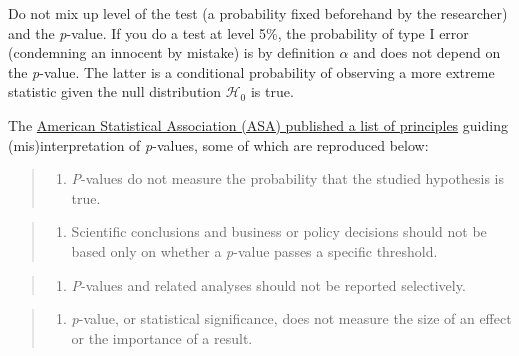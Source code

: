 \documentclass[
  11pt,
  letterpaper,
]{scrbook}
\providecommand{\tightlist}{%
  \setlength{\itemsep}{0pt}\setlength{\parskip}{0pt}}\usepackage{longtable,booktabs,array}
\theoremstyle{definition}
\theoremstyle{definition}
\theoremstyle{remark}
\begin{document}
Do not mix up level of the test (a probability fixed beforehand by the
researcher) and the \emph{p}-value. If you do a test at level 5\%, the
probability of type I error (condemning an innocent by mistake) is by
definition \(\alpha\) and does not depend on the \emph{p}-value. The
latter is a conditional probability of observing a more extreme
statistic given the null distribution \(\mathscr{H}_0\) is true.

\begin{tcolorbox}[enhanced jigsaw, opacityback=0, opacitybacktitle=0.6, leftrule=.75mm, colbacktitle=quarto-callout-caution-color!10!white, breakable, toptitle=1mm, bottomrule=.15mm, title=\textcolor{quarto-callout-caution-color}{\faFire}\hspace{0.5em}{Pitfall}, coltitle=black, colframe=quarto-callout-caution-color-frame, colback=white, left=2mm, toprule=.15mm, arc=.35mm, bottomtitle=1mm, titlerule=0mm, rightrule=.15mm]

The \href{https://doi.org/10.1080/00031305.2016.1154108}{American
Statistical Association (ASA) published a list of principles} guiding
(mis)interpretation of \emph{p}-values, some of which are reproduced
below:

\begin{quote}
\begin{enumerate}
\def\labelenumi{(\arabic{enumi})}
\setcounter{enumi}{1}
\tightlist
\item
  \emph{P}-values do not measure the probability that the studied
  hypothesis is true.
\end{enumerate}
\end{quote}

\begin{quote}
\begin{enumerate}
\def\labelenumi{(\arabic{enumi})}
\setcounter{enumi}{2}
\tightlist
\item
  Scientific conclusions and business or policy decisions should not be
  based only on whether a \emph{p}-value passes a specific threshold.
\end{enumerate}
\end{quote}

\begin{quote}
\begin{enumerate}
\def\labelenumi{(\arabic{enumi})}
\setcounter{enumi}{3}
\tightlist
\item
  \emph{P}-values and related analyses should not be reported
  selectively.
\end{enumerate}
\end{quote}

\begin{quote}
\begin{enumerate}
\def\labelenumi{(\arabic{enumi})}
\setcounter{enumi}{4}
\tightlist
\item
  \emph{p}-value, or statistical significance, does not measure the size
  of an effect or the importance of a result.
\end{enumerate}
\end{quote}

\end{tcolorbox}
\end{document}
